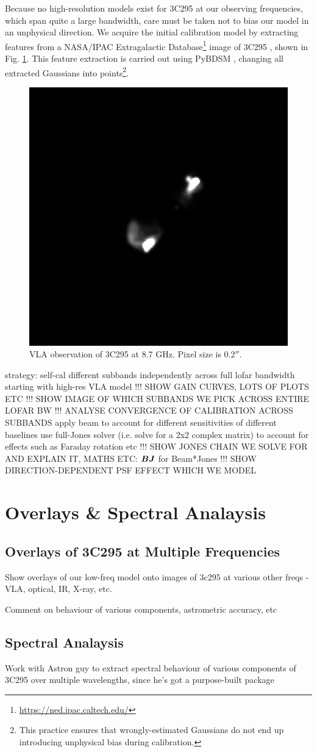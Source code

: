 \pg
Because no high-resolution models exist for 3C295 at our observing frequencies, which span quite a large bandwidth, care must be taken not to bias our model in an unphysical direction. We acquire the initial calibration model by extracting features from a NASA/IPAC Extragalactic Database\footnote{\hyperref[here]{https://ned.ipac.caltech.edu/}} image of 3C295 , shown in Fig. \ref{fig.vla.3c295}. This feature extraction is carried out using PyBDSM , changing all extracted Gaussians into points\footnote{This practice ensures that wrongly-estimated Gaussians do not end up introducing unphysical bias during calibration.}.
\begin{figure}[h]
\includegraphics[width=0.4\linewidth]{images/3c295-vla}
\caption{\label{fig.vla.3c295}VLA observation of 3C295 at 8.7 GHz. Pixel size is $0.2''$.}
\end{figure}


\pg
strategy: self-cal different subbands independently across full lofar bandwidth starting with high-res VLA model
\pg
               !!! SHOW GAIN CURVES, LOTS OF PLOTS ETC
\pg
               !!! SHOW IMAGE OF WHICH SUBBANDS WE PICK ACROSS ENTIRE LOFAR BW
\pg
               !!! ANALYSE CONVERGENCE OF CALIBRATION ACROSS SUBBANDS
\pg
apply beam to account for different sensitivities of different baselines
\pg
use full-Jones solver (i.e. solve for a 2x2 complex matrix) to account for effects such as Faraday rotation etc
\pg
!!! SHOW JONES CHAIN WE SOLVE FOR AND EXPLAIN IT, MATHS ETC: ${\bm{B}}{\bm{J}}$ for Beam*Jones
\pg
!!! SHOW DIRECTION-DEPENDENT PSF EFFECT WHICH WE MODEL


\section{Overlays \& Spectral Analaysis}

\subsection{Overlays of 3C295 at Multiple Frequencies}
\pg
Show overlays of our low-freq model onto images of 3c295 at various other freqs - VLA, optical, IR, X-ray, etc.

\pg
Comment on behaviour of various components, astrometric accuracy, etc

\subsection{Spectral Analaysis}

\pg
Work with Astron guy to extract spectral behaviour of various components of 3C295 over multiple wavelengths, since he's got a purpose-built package